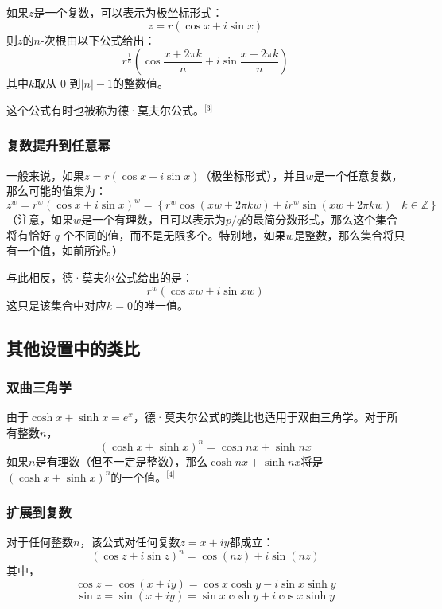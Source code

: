 如果\( z \)是一个复数，可以表示为极坐标形式：
\[
z = r \left( \cos x + i \sin x \right)~
\]
则\( z \)的\( n \)-次根由以下公式给出：
\[
r^{\frac{1}{n}} \left( \cos \frac{x + 2\pi k}{n} + i \sin \frac{x + 2\pi k}{n} \right)~
\]
其中\( k \)取从 0 到\( |n| - 1 \)的整数值。

这个公式有时也被称为德·莫夫尔公式。\(^\text{[3]}\)
\subsubsection{复数提升到任意幂}  
一般来说，如果\(z = r (\cos x + i \sin x)\)（极坐标形式），并且\(w\)是一个任意复数，那么可能的值集为：
\[
z^w = r^w \left( \cos x + i \sin x \right)^w = \left\{ r^w \cos \left( xw + 2\pi kw \right) + i r^w \sin \left( xw + 2\pi kw \right) \mid k \in \mathbb{Z} \right\}~
\]
（注意，如果\( w \)是一个有理数，且可以表示为\(p/q\)的最简分数形式，那么这个集合将有恰好 \( q \) 个不同的值，而不是无限多个。特别地，如果\( w \)是整数，那么集合将只有一个值，如前所述。）  

与此相反，德·莫夫尔公式给出的是：
\[
r^w (\cos xw + i \sin xw)~
\]
这只是该集合中对应\( k = 0 \)的唯一值。
\subsection{其他设置中的类比}  
\subsubsection{双曲三角学}  
由于\( \cosh x + \sinh x = e^x \)，德·莫夫尔公式的类比也适用于双曲三角学。对于所有整数\(n\)，
\[
(\cosh x + \sinh x)^n = \cosh nx + \sinh nx~
\]
如果\( n \)是有理数（但不一定是整数），那么\(\cosh nx + \sinh nx\)将是\( (\cosh x + \sinh x)^n \)的一个值。\(^\text{[4]}\)
\subsubsection{扩展到复数}  
对于任何整数\( n \)，该公式对任何复数\( z = x + iy \)都成立：
\[
(\cos z + i \sin z)^n = \cos(nz) + i \sin(nz)~
\]
其中，
\[
\cos z = \cos(x + iy) = \cos x \cosh y - i \sin x \sinh y~
\]
\[
\sin z = \sin(x + iy) = \sin x \cosh y + i \cos x \sinh y~
\]